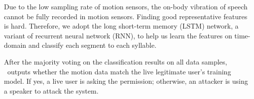 Due to the low sampling rate of motion sensors, the on-body vibration of speech cannot be fully recorded in motion sensors. Finding good representative features is hard. Therefore, we adopt the long short-term memory (LSTM) network, a variant of recurrent neural network (RNN), to help us learn the features on time-domain and classify each segment to each syllable. 

After the majority voting on the classification results on all data samples, \shortname~outputs whether the motion data match the live legitimate user's training model. If yes, a live user is asking the permission; otherwise, an attacker is using a speaker to attack the system. 






